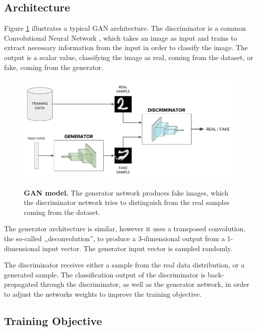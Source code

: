 \documentclass[12pt]{report}
\begin{document}
\subsection{Architecture}

Figure \ref{fig:gan} illustrates a typical GAN architecture. The discriminator is a common Convolutional Neural Network \cite{lecun_convolutional_1995}, which takes an image as input and trains to extract necessary information from the input in order to classify the image. The output is a scalar value, classifying the image as real, coming from the dataset, or fake, coming from the generator.

\begin{figure}[h]
\centering
{\includegraphics[width=\linewidth]{02_background/gan_model}}
\caption{\label{fig:gan} \textbf{GAN model.} The generator network produces fake images, which the discriminator network tries to distinguish from the real samples coming from the dataset.}
\end{figure}

The generator architecture is similar, however it uses a transposed convolution, the so-called ,,deconvolution'', to produce a 3-dimensional output from a 1-dimensional input vector. The generator input vector is sampled randomly.

The discriminator receives either a sample from the real data distribution, or a generated sample. The classification output of the discriminator is back-propagated  through the discriminator, as well as the generator network, in order to adjust the networks weights to improve the training objective.

\subsection{Training Objective} \label{sec:GAN_training}
\end{document}
